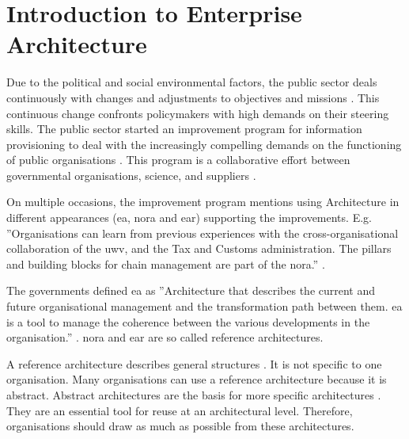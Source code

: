 \section{Introduction to Enterprise Architecture}
\label{sec:introea}
Due to the political and social environmental factors, the public sector deals continuously with changes and adjustments to objectives and missions \parencite{EARbaten}. This continuous change confronts policymakers with high demands on their steering skills. The public sector started an improvement program for information provisioning \parencite{Digitaleoverheid2021} to deal with the increasingly compelling demands on the functioning of public organisations \parencite[p.~13]{Eck2009}. This program is a collaborative effort between governmental organisations, science, and suppliers \parencite[p.~128]{Digitaleoverheid2021}.

On multiple occasions, the improvement program mentions using Architecture in different appearances (\gls{ea}, \acrfull{nora} and \acrfull{ear}) supporting the improvements. E.g. ''Organisations can learn from previous experiences with the cross-organisational collaboration of the \acrlong{uwv}, and the Tax and Customs administration. The pillars and building blocks for chain management are part of the \acrshort{nora}.'' \parencite[p.~40]{Digitaleoverheid2021}. 

The governments defined \gls{ea} as ''Architecture that describes the current and future organisational management and the transformation path between them. \gls{ea} is a tool to manage the coherence between the various developments in the organisation.'' \parencite{NoraEA}. \acrshort{nora} and \acrshort{ear} are so called reference architectures.

A reference architecture describes general structures \parencite[p.~8]{Greefhorst2008}. It is not specific to one organisation. Many organisations can use a reference architecture because it is abstract. Abstract architectures are the basis for more specific architectures \parencite[p.~11]{Greefhorst2008}. They are an essential tool for reuse at an architectural level. Therefore, organisations should draw as much as possible from these architectures.

